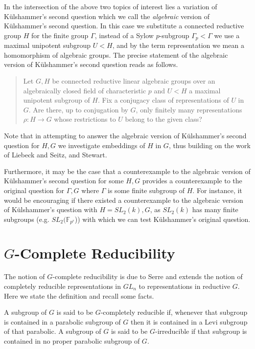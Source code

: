In the intersection of the above two topics of interest lies a variation of K\"ulshammer's second question which we call the \emph{algebraic} version of K\"ulshammer's second question. In this case we substitute a connected reductive group $H$ for the finite group $\Gamma$, instead of a Sylow $p$-subgroup $\Gamma_p < \Gamma$ we use a maximal unipotent subgroup $U < H$, and by the term representation we mean a homomorphism of algebraic groups.
The precise statement of the algebraic version of K\"ulshammer's second question reads as follows.
\begin{quote}
  Let $G,H$ be connected reductive linear algebraic groups over an algebraically closed field of characteristic $p$ and $U < H$ a maximal unipotent subgroup of $H$. Fix a conjugacy class of representations of $U$ in $G$. Are there, up to conjugation by $G$, only finitely many representations $\rho:H\rightarrow G$ whose restrictions to $U$ belong to the given class?
\end{quote}

Note that in attempting to answer the algebraic version of K\"ulshammer's second question for $H,G$ we investigate embeddings of $H$ in $G$, thus building on the work of Liebeck and Seitz, and Stewart.

Furthermore, it may be the case that a counterexample to the algebraic version of K\"ulshammer's second question for some $H, G$ provides a counterexample to the original question for $\Gamma, G$ where $\Gamma$ is some finite subgroup of $H$. For instance, it would be encouraging if there existed a counterexample to the algebraic version of K\"ulshammer's question with $H = SL_2(k), G$, as $SL_2(k)$ has many finite subgroups (e.g. $SL_2(\mathbb{F}_{p^r}$)) with which we can test K\"ulshammer's original question.

\section{$G$-Complete Reducibility}

The notion of $G$-complete reducibility is due to Serre \cite{serre1998ml} and extends the notion of completely reducible representations in $GL_n$ to representations in reductive $G$. Here we state the definition and recall some facts.

A subgroup of $G$ is said to be $G$-completely reducible if, whenever that subgroup is contained in a parabolic subgroup of $G$ then it is contained in a Levi subgroup of that parabolic. 
A subgroup of $G$ is said to be $G$-irreducible if that subgroup is contained in no proper parabolic subgroup of $G$.

